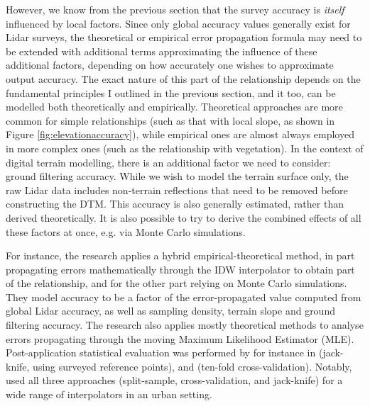 However, we know from the previous section that the survey accuracy is \textit{itself} influenced by local factors. Since only global accuracy values generally exist for Lidar surveys, the theoretical or empirical error propagation formula may need to be extended with additional terms approximating the influence of these additional factors, depending on how accurately one wishes to approximate output accuracy. The exact nature of this part of the relationship depends on the fundamental principles I outlined in the previous section, and it too, can be modelled both theoretically and empirically. Theoretical approaches are more common for simple relationships (such as that with local slope, as shown in Figure \ref{fig:elevationaccuracy}), while empirical ones are almost always employed in more complex ones (such as the relationship with vegetation). In the context of digital terrain modelling, there is an additional factor we need to consider: ground filtering accuracy. While we wish to model the terrain surface only, the raw Lidar data includes non-terrain reflections that need to be removed before constructing the DTM. This accuracy is also generally estimated, rather than derived theoretically. It is also possible to try to derive the combined effects of all these factors at once, e.g. via Monte Carlo simulations.

For instance, the research \cite{aguilar_etal_2010} applies a hybrid empirical-theoretical method, in part propagating errors mathematically through the IDW interpolator to obtain part of the relationship, and for the other part relying on Monte Carlo simulations. They model accuracy to be a factor of the error-propagated value computed from global Lidar accuracy, as well as sampling density, terrain slope and ground filtering accuracy. The research \cite{kraus_etal_2006} also applies mostly theoretical methods to analyse errors propagating through the moving Maximum Likelihood Estimator (MLE). Post-application statistical evaluation was performed by for instance in \cite{peng_shih_2006} (jack-knife, using surveyed reference points), and \cite{guo_etal_2010} (ten-fold cross-validation). Notably, \cite{smith_etal_2005} used all three approaches (split-sample, cross-validation, and jack-knife) for a wide range of interpolators in an urban setting.


